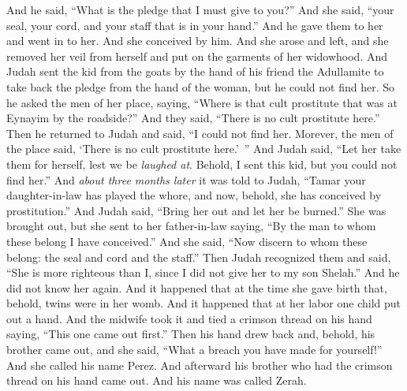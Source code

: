 \begin{biblechapter}
\verse And he said, “What is the pledge that I must give to you?” And she said, “your seal, your cord, and your staff that is in your hand.” And he gave them to her and went in to her. And she conceived by him.
\verse And she arose and left, and she removed her veil from herself and put on the garments of her widowhood.
\verse And Judah sent the kid from the goats by the hand of his friend the Adullamite to take back the pledge from the hand of the woman, but he could not find her.
\verse So he asked the men of her place, saying, “Where is that cult prostitute that was at Eynayim by the roadside?” And they said, “There is no cult prostitute here.”
\verse Then he returned to Judah and said, “I could not find her. Morever, the men of the place said, ‘There is no cult prostitute here.’ ”
\verse And Judah said, “Let her take them for herself, lest we be \textit{laughed at}. Behold, I sent this kid, but you could not find her.”
\verse And \textit{about three months later} it was told to Judah, “Tamar your daughter-in-law has played the whore, and now, behold, she has conceived by prostitution.” And Judah said, “Bring her out and let her be burned.”
\verse She was brought out, but she sent to her father-in-law saying, “By the man to whom these belong I have conceived.” And she said, “Now discern to whom these belong: the seal and cord and the staff.”
\verse Then Judah recognized them and said, “She is more righteous than I, since I did not give her to my son Shelah.” And he did not know her again.
\verse And it happened that at the time she gave birth that, behold, twins were in her womb.
\verse And it happened that at her labor one child put out a hand. And the midwife took it and tied a crimson thread on his hand saying, “This one came out first.”
\verse Then his hand drew back and, behold, his brother came out, and she said, “What a breach you have made for yourself!” And she called his name Perez.
\verse And afterward his brother who had the crimson thread on his hand came out. And his name was called Zerah.
\end{biblechapter}

